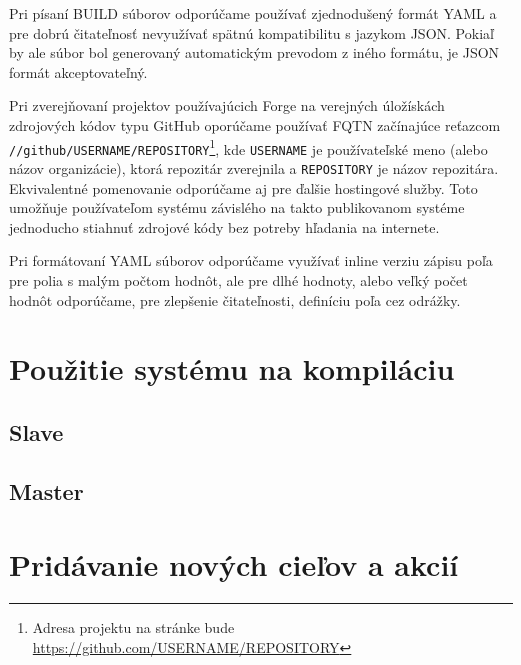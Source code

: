 Pri písaní BUILD súborov odporúčame používať zjednodušený formát YAML a pre dobrú
čitateľnosť nevyužívať spätnú kompatibilitu s jazykom JSON. Pokiaľ by ale súbor bol
generovaný automatickým prevodom z iného formátu, je JSON formát akceptovateľný.

Pri zverejňovaní projektov používajúcich Forge na verejných úložískách zdrojových
kódov typu GitHub oporúčame používať FQTN začínajúce reťazcom \texttt{//github/USERNAME/REPOSITORY}\footnote{Adresa projektu na stránke bude \url{https://github.com/USERNAME/REPOSITORY}},
kde \texttt{USERNAME} je používateľské meno (alebo názov organizácie), ktorá repozitár
zverejnila a \texttt{REPOSITORY} je názov repozitára. Ekvivalentné pomenovanie odporúčame
aj pre ďalšie hostingové služby. Toto umožňuje používateľom systému závislého na
takto publikovanom systéme jednoducho stiahnuť zdrojové kódy bez potreby hľadania
na internete.

Pri formátovaní YAML súborov odporúčame využívať inline verziu zápisu poľa pre
polia s malým počtom hodnôt, ale pre dlhé hodnoty, alebo veľký počet hodnôt odporúčame,
pre zlepšenie čitateľnosti, definíciu poľa cez odrážky.

\section{Pou\v{z}itie syst\'{e}mu na kompil\'{a}ciu}
\label{sec:usage}

\subsection{Slave}
\label{sec:usage:server}

\subsection{Master}
\label{sec:usage:client}

\section{Prid\'{a}vanie nov\'{y}ch cie\v{l}ov a akci\'{i}}
\label{sec:contributing}
